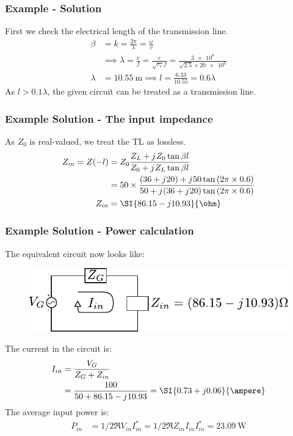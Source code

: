 \documentclass[10pt, compress]{beamer}
\renewcommand{\O}{\omega}  %
\newcommand{\E}{\varepsilon}  %
\renewcommand{\j}{{j}\mkern1mu} %
\begin{document}
\begin{frame}
  \frametitle{Example - Solution}
First we check the electrical length of the transmission line.
  \begin{align*}
    \beta &= k = \frac{2 \pi}{\lambda} = \frac{\O}{v} \\
    & \implies \lambda = \frac{v}{f} = \frac{c}{\sqrt{\E_r} f} = \frac{\num{3e8}}{\sqrt{2.5} \times \num{20e6}} \\
    \lambda &= \SI{10.55}{\m} \implies l = \frac{6.33}{10.55} = 0.6 \lambda
  \end{align*}
As $l > 0.1 \lambda$, the given circuit can be treated as a transmission line.
\end{frame}


\begin{frame}
  \frametitle{Example Solution - The input impedance}

  As $Z_0$ is real-valued, we treat the TL as lossless.
  \begin{align*}
    Z_{in} = Z(-l) &= Z_0 \frac{Z_L + \j Z_0 \tan{\beta l}}{Z_0 + \j Z_L \tan{\beta l}}  \\
    &= 50 \times \frac{(36 + \j 20) + \j 50 \tan{(2 \pi \times 0.6)}}{50 +  \j (36 + \j 20) \tan{(2 \pi \times 0.6)}} \\
    Z_{in}&= \SI{86.15 - j10.93}{\ohm}
  \end{align*}

  
\end{frame}
\begin{frame}
  \frametitle{Example Solution - Power calculation}

  The equivalent circuit now looks like:
  \begin{figure}[H!]
    \centering
    \includegraphics[width=.6\textwidth]{tline_terminated_example_power.pdf}
  \end{figure}
  The current in the circuit is:
  \begin{align*}
    I_{in} &= \frac{V_G}{Z_G + Z_{in}} \\
    &= \frac{100}{50 + 86.15 - \j 10.93} = \SI{0.73 + j 0.06}{\ampere}
  \end{align*}
  The average input power is:
  \begin{align*}
    P_{in} &= 1/2 \Re{V_{in} I_{in}^*} = 1/2 \Re{Z_{in} I_{in} I_{in}^*} = \SI{23.09}{\watt} 
  \end{align*}

\end{frame}
\end{document}
